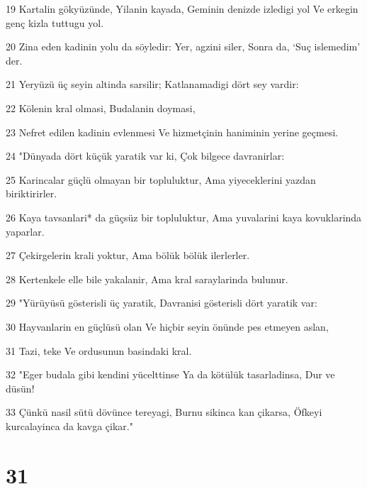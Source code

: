 \par 19 Kartalin gökyüzünde, Yilanin kayada, Geminin denizde izledigi yol Ve erkegin genç kizla tuttugu yol.
\par 20 Zina eden kadinin yolu da söyledir: Yer, agzini siler, Sonra da, `Suç islemedim' der.
\par 21 Yeryüzü üç seyin altinda sarsilir; Katlanamadigi dört sey vardir:
\par 22 Kölenin kral olmasi, Budalanin doymasi,
\par 23 Nefret edilen kadinin evlenmesi Ve hizmetçinin haniminin yerine geçmesi.
\par 24 "Dünyada dört küçük yaratik var ki, Çok bilgece davranirlar:
\par 25 Karincalar güçlü olmayan bir topluluktur, Ama yiyeceklerini yazdan biriktirirler.
\par 26 Kaya tavsanlari* da güçsüz bir topluluktur, Ama yuvalarini kaya kovuklarinda yaparlar.
\par 27 Çekirgelerin krali yoktur, Ama bölük bölük ilerlerler.
\par 28 Kertenkele elle bile yakalanir, Ama kral saraylarinda bulunur.
\par 29 "Yürüyüsü gösterisli üç yaratik, Davranisi gösterisli dört yaratik var:
\par 30 Hayvanlarin en güçlüsü olan Ve hiçbir seyin önünde pes etmeyen aslan,
\par 31 Tazi, teke Ve ordusunun basindaki kral.
\par 32 "Eger budala gibi kendini yücelttinse Ya da kötülük tasarladinsa, Dur ve düsün!
\par 33 Çünkü nasil sütü dövünce tereyagi, Burnu sikinca kan çikarsa, Öfkeyi kurcalayinca da kavga çikar."

\chapter{31}

